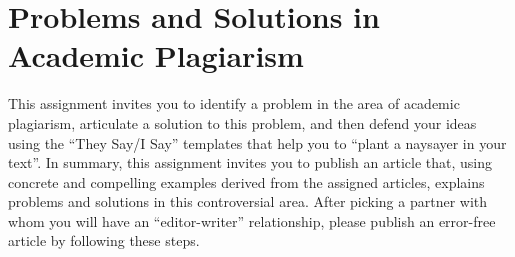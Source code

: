 \section*{Problems and Solutions in Academic Plagiarism}

This assignment invites you to identify a problem in the area of academic plagiarism, articulate a solution to this
problem, and then defend your ideas using the ``They Say/I Say'' templates that help you to ``plant a naysayer in your
text''. In summary, this assignment invites you to publish an article that, using concrete and compelling examples
derived from the assigned articles, explains problems and solutions in this controversial area. After picking a partner
with whom you will have an ``editor-writer'' relationship, please publish an error-free article by following these
steps.

\vspace*{-.1in}

